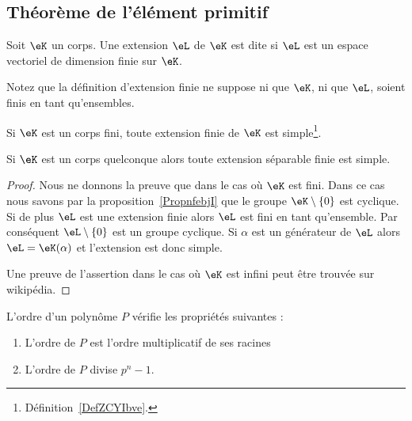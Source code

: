\subsection{Théorème de l'élément primitif}

\begin{definition}
	Soit \( \eK\) un corps. Une extension \( \eL\) de \( \eK\) est dite  si \( \eL\) est un espace vectoriel de dimension finie sur \( \eK\).
\end{definition}
Notez que la définition d'extension finie ne suppose ni que \( \eK\), ni que \( \eL\), soient finis en tant qu'ensembles.

\begin{theorem}		\label{THOooYFLZooHYENKp}
	\begin{description}
		\item
		      Si \( \eK\) est un corps fini, toute extension finie de \( \eK\) est simple\footnote{Définition~\ref{DefZCYIbve}.}.
		\item
		      Si \( \eK\) est un corps quelconque alors toute extension séparable finie est simple.
	\end{description}
\end{theorem}

\begin{proof}
	Nous ne donnons la preuve que dans le cas où \( \eK\) est fini. Dans ce cas nous savons par la proposition~\ref{PropnfebjI} que le groupe \( \eK\setminus\{ 0 \}\) est cyclique. Si de plus \( \eL\) est une extension finie alors \( \eL\) est fini en tant qu'ensemble. Par conséquent \( \eL\setminus\{ 0 \}\) est un groupe cyclique. Si \( \alpha\) est un générateur de \( \eL\) alors \( \eL=\eK(\alpha)\) et l'extension est donc simple.

	Une preuve de l'assertion dans le cas où \( \eK\) est infini peut être trouvée sur wikipédia.
\end{proof}

\begin{proposition}		\label{PROPooWNHYooSzMJqF}
	L'ordre d'un polynôme \( P\) vérifie les propriétés suivantes :
	\begin{enumerate}
		\item
		      L'ordre de \( P\) est l'ordre multiplicatif de ses racines
		\item
		      L'ordre de \( P\) divise \( p^n-1\).
	\end{enumerate}
\end{proposition}

